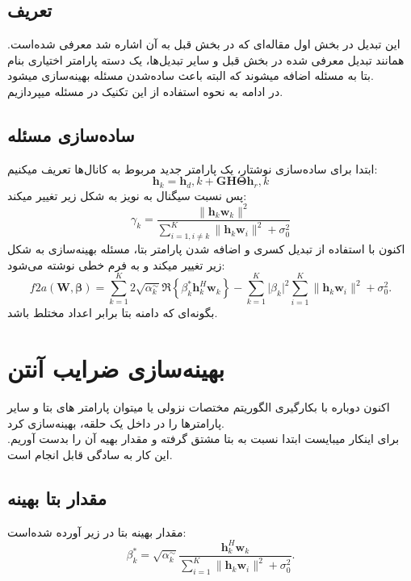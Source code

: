 \subsection{تعریف}
این تبدیل در بخش اول مقاله‌ای که در بخش قبل به آن اشاره شد معرفی شده‌است. همانند تبدیل معرفی شده در بخش قبل و سایر تبدیل‌ها، یک دسته پارامتر اختیاری بنام بتا به مسئله اضافه میشوند که البته باعث ساده‌شدن مسئله بهینه‌سازی میشود.\\
در ادامه به نحوه استفاده از این تکنیک در مسئله میپردازیم.
\subsection{ساده‌سازی مسئله}
ابتدا برای ساده‌سازی نوشتار، یک پارامتر جدید مربوط به کانال‌ها تعریف میکنیم:
\[\mathbf{h}_k = \mathbf{h}_d,k + \mathbf{GH}\boldsymbol{\Theta}\mathbf{h}_r,k\]
پس نسبت سیگنال به نویز به شکل زیر تغییر میکند:
\[
\gamma_k = \frac{{\lVert \mathbf{h}_k \mathbf{w}_k \rVert^2}}{{\sum_{i=1,i\neq k}^{K} \lVert \mathbf{h}_k \mathbf{w}_i \rVert^2 + \sigma_0^2}}
\]
اکنون با استفاده از تبدیل کسری و اضافه شدن پارامتر بتا، مسئله بهینه‌سازی به شکل زیر تغییر میکند و به فرم خطی نوشته می‌شود:
\[
f2a(\mathbf{W}, \boldsymbol{\beta}) = \sum_{k=1}^{K} 2 \sqrt{\alpha_k^\sim} \Re \left\{ \beta_k^* \mathbf{h}_k^H \mathbf{w}_k \right\} - \sum_{k=1}^{K} \lvert \beta_k \rvert^2 \sum_{i=1}^{K} \lVert \mathbf{h}_k \mathbf{w}_i \rVert^2 + \sigma_0^2.
\]
بگونه‌ای که دامنه بتا برابر اعداد مختلط باشد.
\section{بهینه‌سازی ضرایب آنتن}
اکنون دوباره با بکارگیری الگوریتم مختصات نزولی یا  میتوان پارامتر های بتا و سایر پارامترها را در داخل یک حلقه، بهینه‌سازی کرد.\\
برای اینکار میبایست ابتدا نسبت به بتا مشتق گرفته و مقدار بهیه آن را بدست آوریم. این کار به سادگی قابل انجام است. 

\subsection{مقدار بتا بهینه}
مقدار بهینه بتا در زیر آورده شده‌است:
\[
\beta_k^* = \sqrt{\alpha_k^\sim} \frac{{\mathbf{h}_k^H \mathbf{w}_k}}{{\sum_{i=1}^{K} \lVert \mathbf{h}_k \mathbf{w}_i \rVert^2 + \sigma_0^2}}.
\]
